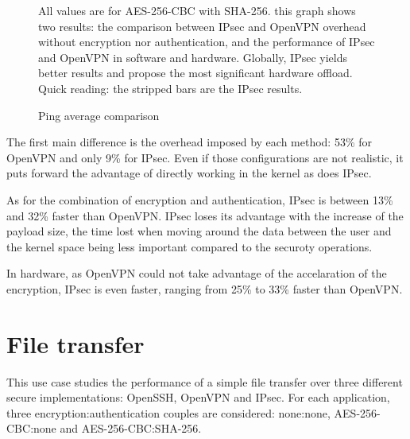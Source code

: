 \begin{figure}[ht]

\caption{Ping average comparison}{All values are for AES-256-CBC with SHA-256. this graph shows two results: the comparison between IPsec and OpenVPN overhead without encryption nor authentication, and the performance of IPsec and OpenVPN in software and hardware. Globally, IPsec yields better results and propose the most significant hardware offload. Quick reading: the stripped bars are the IPsec results.}
\label{fig:ping-benchmark-comparison}
\end{figure}

The first main difference is the overhead imposed by each method: 53\% for OpenVPN and only 9\% for IPsec.
Even if those configurations are not realistic, it puts forward the advantage of directly working in the kernel as does IPsec.

As for the combination of encryption and authentication, IPsec is between 13\% and 32\% faster than OpenVPN.
IPsec loses its advantage with the increase of the payload size, the time lost when moving around the data between the user and the kernel space being less important compared to the securoty operations.

\noindent In hardware, as OpenVPN could not take advantage of the accelaration of the encryption, IPsec is even faster, ranging from 25\% to 33\% faster than OpenVPN.














\section{File transfer}

This use case studies the performance of a simple file transfer over three different secure implementations: OpenSSH, OpenVPN and IPsec.
For each application, three encryption:authentication couples are considered: none:none, AES-256-CBC:none and AES-256-CBC:SHA-256. 

